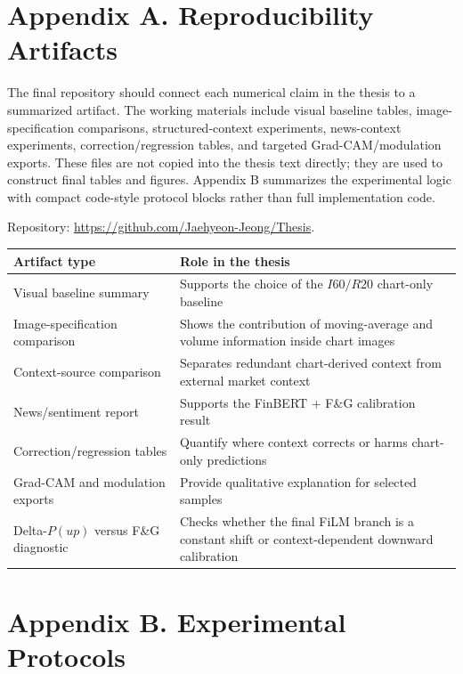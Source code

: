 \documentclass[14pt,a4paper]{extarticle}
\begin{document}
\clearpage

\section*{Appendix A. Reproducibility Artifacts}

The final repository should connect each numerical claim in the thesis to a summarized artifact. The working materials include visual baseline tables, image-specification comparisons, structured-context experiments, news-context experiments, correction/regression tables, and targeted Grad-CAM/modulation exports. These files are not copied into the thesis text directly; they are used to construct final tables and figures. Appendix B summarizes the experimental logic with compact code-style protocol blocks rather than full implementation code.

Repository: \url{https://github.com/Jaehyeon-Jeong/Thesis}.

\begin{center}
\begin{longtable}{p{}p{}}
\toprule
\textbf{Artifact type} & \textbf{Role in the thesis}\\
\midrule
Visual baseline summary & Supports the choice of the $I60/R20$ chart-only baseline\\
Image-specification comparison & Shows the contribution of moving-average and volume information inside chart images\\
Context-source comparison & Separates redundant chart-derived context from external market context\\
News/sentiment report & Supports the FinBERT + F\&G calibration result\\
Correction/regression tables & Quantify where context corrects or harms chart-only predictions\\
Grad-CAM and modulation exports & Provide qualitative explanation for selected samples\\
Delta-$P(up)$ versus F\&G diagnostic & Checks whether the final FiLM branch is a constant shift or context-dependent downward calibration\\
\bottomrule
\end{longtable}
\end{center}

\clearpage

\section*{Appendix B. Experimental Protocols}
\end{document}
